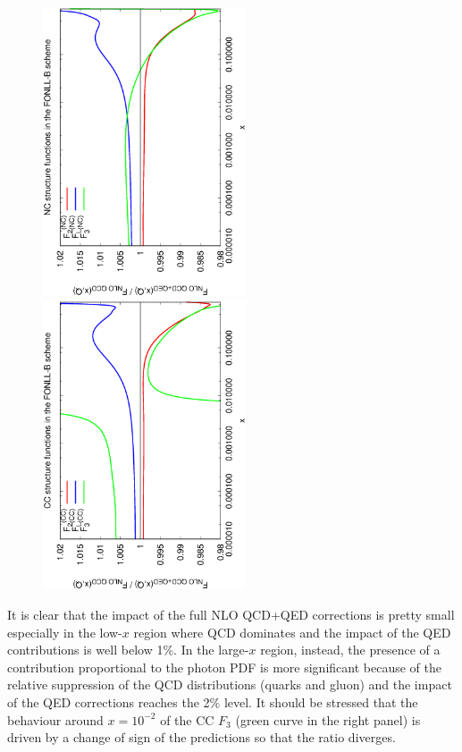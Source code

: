 \begin{figure}[h]
\includegraphics[width=6cm,angle=270]{figs/NLOQEDCorrections_NC.eps}
\includegraphics[width=6cm,angle=270]{figs/NLOQEDCorrections_CC.eps}
\caption{}
\label{fig:StructFuncs}
\end{figure}

It is clear that the impact of the full NLO QCD+QED corrections is
pretty small especially in the low-$x$ region where QCD dominates and
the impact of the QED contributions is well below 1\%. In the
large-$x$ region, instead, the presence of a contribution proportional
to the photon PDF is more significant because of the relative
suppression of the QCD distributions (quarks and gluon) and the impact
of the QED corrections reaches the 2\% level.  It should be stressed
that the behaviour around $x=10^{-2}$ of the CC $F_3$ (green curve in
the right panel) is driven by a change of sign of the predictions so
that the ratio diverges.

